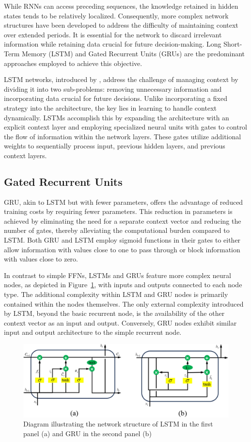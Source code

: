 While RNNs can access preceding sequences, the knowledge retained in hidden states tends to be relatively localized. 
Consequently, more complex network structures have been developed to address the difficulty of maintaining context over extended periods. 
It is essential for the network to discard irrelevant information while retaining data crucial for future decision-making. 
Long Short-Term Memory (LSTM) and Gated Recurrent Units (GRUs) are the predominant approaches employed to achieve this objective.

LSTM networks, introduced by \cite{hochreiter97}, address the challenge of managing context by dividing it into two sub-problems: removing unnecessary information and incorporating data crucial for future decisions. 
Unlike incorporating a fixed strategy into the architecture, the key lies in learning to handle context dynamically. 
LSTMs accomplish this by expanding the architecture with an explicit context layer and employing specialized neural units with gates to control the flow of information within the network layers. 
These gates utilize additional weights to sequentially process input, previous hidden layers, and previous context layers.

\subsection{Gated Recurrent Units}
GRU, akin to LSTM but with fewer parameters, offers the advantage of reduced training costs by requiring fewer parameters. 
This reduction in parameters is achieved by eliminating the need for a separate context vector and reducing the number of gates, thereby alleviating the computational burden compared to LSTM. 
Both GRU and LSTM employ sigmoid functions in their gates to either allow information with values close to one to pass through or block information with values close to zero. 

In contrast to simple FFNs, LSTMs and GRUs feature more complex neural nodes, as depicted in Figure~\ref{fig:lstm-vs-gru}, with inputs and outputs connected to each node type. 
The additional complexity within LSTM and GRU nodes is primarily contained within the nodes themselves. 
The only external complexity introduced by LSTM, beyond the basic recurrent node, is the availability of the other context vector as an input and output. 
Conversely, GRU nodes exhibit similar input and output architecture to the simple recurrent node.
\begin{figure}[h]
	\centering
	\includegraphics[width=0.7\linewidth]{Figures/LSTM-vs-GRU}
	\caption{Diagram illustrating the network structure of LSTM in the first panel (a) and GRU in the second panel (b)}
	\label{fig:lstm-vs-gru}
\end{figure}

